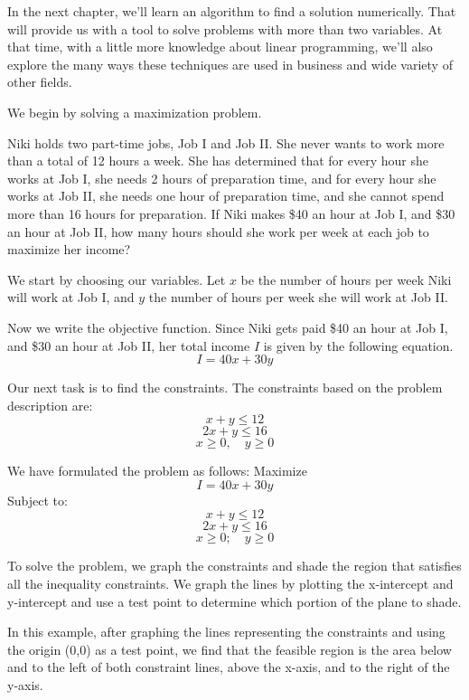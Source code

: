 In the next chapter, we'll learn an algorithm to find a solution numerically.  That will provide us with a tool to solve problems with more than two variables. At that time, with a little more knowledge about linear programming, we’ll also explore the many ways these techniques are used in business and wide variety of other fields.

We begin by solving a maximization problem.

\begin{example}\label{niki_geometry}
    Niki holds two part-time jobs, Job I and Job II. She never wants to work more than a total of 12 hours a week. She has determined that for every hour she works at Job I, she needs 2 hours of preparation time, and for every hour she works at Job II, she needs one hour of preparation time, and she cannot spend more than 16 hours for preparation.
    If Niki makes \$40 an hour at Job I, and \$30 an hour at Job II, how many hours should she work per week at each job to maximize her income?
\end{example}

\begin{solution}
    We start by choosing our variables.
    Let \( x \) be the number of hours per week Niki will work at Job I, and \( y \) the number of hours per week she will work at Job II.

    Now we write the objective function. Since Niki gets paid \$40 an hour at Job I, and \$30 an hour at Job II, her total income \( I \) is given by the following equation.
    \[ I = 40x + 30y \]

    Our next task is to find the constraints. The constraints based on the problem description are:
    \[ x + y \leq 12 \]
    \[ 2x + y \leq 16 \]
    \[ x \geq 0, \quad y \geq 0 \]

    We have formulated the problem as follows:
    Maximize
    \[ I = 40x + 30y \]
    Subject to:
    \[ x + y \leq 12 \]
    \[ 2x + y \leq 16 \]
    \[ x \geq 0; \quad y \geq 0 \]

    To solve the problem, we graph the constraints and shade the region that satisfies all the inequality constraints. We graph the lines by plotting the x-intercept and y-intercept and use a test point to determine which portion of the plane to shade.

    In this example, after graphing the lines representing the constraints and using the origin (0,0) as a test point, we find that the feasible region is the area below and to the left of both constraint lines, above the x-axis, and to the right of the y-axis.
\end{solution}

